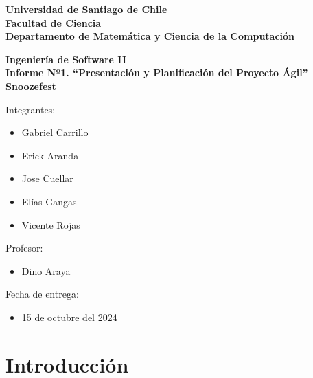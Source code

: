 \documentclass[letterpaper, 10pt]{article}
\newcommand{\nomproyecto}{Snoozefest}
\newenvironment{simplelist}
	{
		\renewcommand\labelitemi{}
		\begin{itemize}
		\setlength{\itemsep}{0pt}
		\setlength{\parskip}{0pt}
	}
	{\end{itemize}}
\begin{document}
\begin{titlepage}

\begin{center}
	{\bf Universidad de Santiago de Chile}
	\\
    {\bf Facultad de Ciencia}
	\\
    {\bf Departamento de Matem\'atica y Ciencia de la Computaci\'on}
\end{center}

%

\vfill
\begin{center}
{\large\bf Ingeniería de Software II}
\\
{\Large\bf Informe Nº1. “Presentación y Planificación del Proyecto Ágil”}\\
\vspace{1cm}
{\Huge\bf \nomproyecto}
\end{center}
\vfill

%

\begin{flushright}
	\begin{minipage}{0.3\textwidth}
		Integrantes:
		\begin{simplelist}
			\item Gabriel Carrillo
			\item Erick Aranda
			\item Jose Cuellar
			\item Elías Gangas
			\item Vicente Rojas
		\end{simplelist}
	

		Profesor:
		\begin{simplelist}
			\item Dino Araya
		\end{simplelist}
	
		Fecha de entrega:
		\begin{simplelist}
			\item 15 de octubre del 2024
		\end{simplelist}
	\end{minipage}
\end{flushright}

\end{titlepage}

%

\tableofcontents
\listoftables
\listoffigures
\newpage

%

\section{Introducción}
\end{document}
